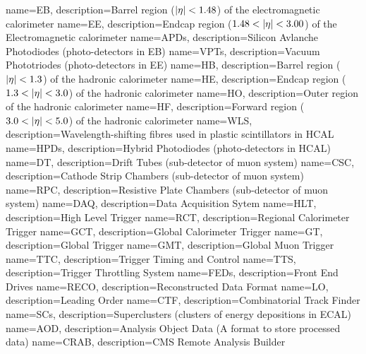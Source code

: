    {name=EB,   description={Barrel region ($\lvert \eta \rvert<1.48$) of the electromagnetic calorimeter}}
   {name=EE,   description={Endcap region ($1.48<\lvert \eta \rvert<3.00$) of the Electromagnetic calorimeter}}
   {name=APDs,   description={Silicon Avlanche Photodiodes (photo-detectors in EB)}}
   {name=VPTs,   description={Vacuum Phototriodes (photo-detectors in EE)}}
   {name=HB,   description={Barrel region ($\lvert \eta \rvert<1.3$) of the hadronic calorimeter}}
   {name=HE,   description={Endcap region ($1.3<\lvert \eta \rvert<3.0$) of the hadronic calorimeter}}
   {name=HO,   description={Outer region of the hadronic calorimeter}}
   {name=HF,   description={Forward region ($3.0<\lvert \eta \rvert<5.0$) of the hadronic calorimeter}}
   {name=WLS,   description={Wavelength-shifting fibres used in plastic scintillators in HCAL}}
   {name=HPDs,   description={Hybrid Photodiodes (photo-detectors in HCAL)}}
   {name=DT,   description={Drift Tubes (sub-detector of muon system)}}
   {name=CSC,   description={Cathode Strip Chambers (sub-detector of muon system)}}
   {name=RPC,   description={Resistive Plate Chambers (sub-detector of muon system)}}
   {name=DAQ,   description={Data Acquisition Sytem}}
   {name=HLT,   description={High Level Trigger}}
   {name=RCT,   description={Regional Calorimeter Trigger}}
   {name=GCT,   description={Global Calorimeter Trigger}}
   {name=GT,   description={Global Trigger}}
   {name=GMT,   description={Global Muon Trigger}}
   {name=TTC,   description={Trigger Timing and Control}}
   {name=TTS,   description={Trigger Throttling System}}
   {name=FEDs,   description={Front End Drives}}
   {name=RECO,   description={Reconstructed Data Format}}
   {name=LO,   description={Leading Order}}
   {name=CTF,   description={Combinatorial Track Finder}}
   {name=SCs,   description={Superclusters (clusters of energy depositions in ECAL)}}
   {name=AOD,   description={Analysis Object Data (A format to store processed data)}}
   {name=CRAB,   description={CMS Remote Analysis Builder }}
